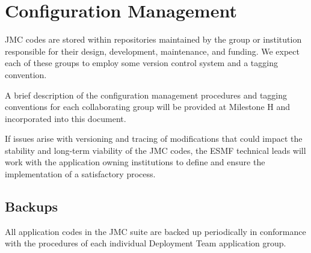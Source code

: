 
\section{Configuration Management}
\label{sec:app_cm}

JMC codes are stored within repositories maintained by the 
group or institution responsible for their design, development,
maintenance, and funding.  We expect each of these groups to employ some 
version control system and a tagging convention.  

A brief description of the configuration management procedures 
and tagging conventions for each collaborating group will be provided 
at Milestone H and incorporated into this document.

If issues arise with versioning and tracing of modifications that 
could impact the stability and long-term viability of the JMC codes, 
the ESMF technical leads will work with the application owning 
institutions to define and ensure the implementation of a satisfactory 
process.

\subsection{Backups}

All application codes in the JMC suite are backed up periodically 
in conformance with the procedures of each individual Deployment Team 
application group.  







